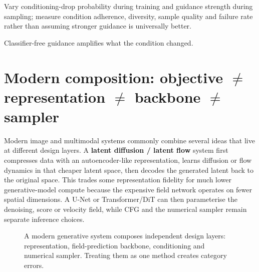 \begin{calloutdegreeofexperiment}
Vary conditioning-drop probability during training and guidance strength during sampling; measure condition adherence, diversity, sample quality and failure rate rather than assuming stronger guidance is universally better.
\end{calloutdegreeofexperiment}

\begin{calloutmemoryhook}
Classifier-free guidance amplifies what the condition changed.
\end{calloutmemoryhook}

\section{Modern composition: objective $\neq$ representation $\neq$ backbone $\neq$ sampler}

Modern image and multimodal systems commonly combine several ideas that live at different design layers.
A \textbf{latent diffusion / latent flow} system first compresses data with an autoencoder-like representation, learns diffusion or flow dynamics in that cheaper latent space, then decodes the generated latent back to the original space.
This trades some representation fidelity for much lower generative-model compute because the expensive field network operates on fewer spatial dimensions.
A U-Net or Transformer/DiT can then parameterise the denoising, score or velocity field, while CFG and the numerical sampler remain separate inference choices.

\begin{figure}[H]
\centering
{}
\caption{A modern generative system composes independent design layers: representation, field-prediction backbone, conditioning and numerical sampler. Treating them as one method creates category errors.}
\label{fig:modern-generative-stack}
\end{figure}

